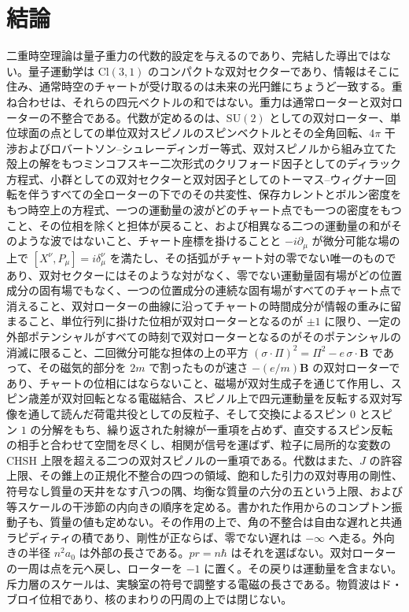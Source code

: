 \documentclass[a4paper]{article}
\begin{document}
\section{結論}
\label{sec:conclusions}

二重時空理論は量子重力の代数的設定を与えるのであり、完結した導出ではない。量子運動学は $\mathrm{Cl}(3,1)$ のコンパクトな双対セクターであり、情報はそこに住み、通常時空のチャートが受け取るのは未来の光円錐にちょうど一致する。重ね合わせは、それらの四元ベクトルの和ではない。重力は通常ローターと双対ローターの不整合である。代数が定めるのは、$\mathrm{SU}(2)$ としての双対ローター、単位球面の点としての単位双対スピノルのスピンベクトルとその全角回転、$4\pi$ 干渉およびロバートソン--シュレーディンガー等式、双対スピノルから組み立てた殻上の解をもつミンコフスキー二次形式のクリフォード因子としてのディラック方程式、小群としての双対セクターと双対因子としてのトーマス--ウィグナー回転を伴うすべての全ローターの下でのその共変性、保存カレントとボルン密度をもつ時空上の方程式、一つの運動量の波がどのチャート点でも一つの密度をもつこと、その位相を除くと担体が戻ること、および相異なる二つの運動量の和がそのような波ではないこと、チャート座標を掛けることと $-i\partial_\mu$ が微分可能な場の上で $[X^\nu,P_\mu]=i\delta^\nu_\mu$ を満たし、その括弧がチャート対の零でない唯一のものであり、双対セクターにはそのような対がなく、零でない運動量固有場がどの位置成分の固有場でもなく、一つの位置成分の連続な固有場がすべてのチャート点で消えること、双対ローターの曲線に沿ってチャートの時間成分が情報の重みに留まること、単位行列に掛けた位相が双対ローターとなるのが $\pm 1$ に限り、一定の外部ポテンシャルがすべての時刻で双対ローターとなるのがそのポテンシャルの消滅に限ること、二回微分可能な担体の上の平方 $(\sigma\cdot\Pi)^2=\Pi^2-e\,\sigma\cdot\mathbf B$ であって、その磁気的部分を $2m$ で割ったものが速さ $-(e/m)\mathbf B$ の双対ローターであり、チャートの位相にはならないこと、磁場が双対生成子を通じて作用し、スピン歳差が双対回転となる電磁結合、スピノル上で四元運動量を反転する双対写像を通して読んだ荷電共役としての反粒子、そして交換によるスピン $0$ とスピン $1$ の分解をもち、繰り返された射線が一重項を占めず、直交するスピン反転の相手と合わせて空間を尽くし、相関が信号を運ばず、粒子に局所的な変数の CHSH 上限を超える二つの双対スピノルの一重項である。代数はまた、$J$ の許容上限、その錐上の正規化不整合の四つの領域、飽和した引力の双対専用の剛性、符号なし質量の天井をなす八つの隅、均衡な質量の六分の五という上限、および等スケールの干渉節の内向きの順序を定める。書かれた作用からのコンプトン振動子も、質量の値も定めない。その作用の上で、角の不整合は自由な遅れと共通ラピディティの積であり、剛性が正ならば、零でない遅れは $-\infty$ へ走る。外向きの半径 \(n^{2}a_{0}\) は外部の長さである。\(pr=n\hbar\) はそれを選ばない。双対ローターの一周は点を元へ戻し、ローターを \(-1\) に置く。その戻りは運動量を含まない。斥力層のスケールは、実験室の符号で調整する電磁の長さである。物質波はド・ブロイ位相であり、核のまわりの円周の上では閉じない。
\end{document}
